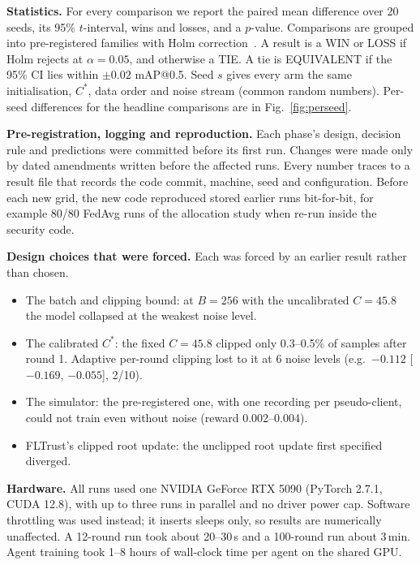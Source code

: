 \documentclass[journal]{IEEEtran}
\makeatletter
\newcommand{\mAP}{mAP@0.5}
\makeatother
\begin{document}
\textbf{Statistics.} For every comparison we report the paired mean difference over 20 seeds, its
95\% $t$-interval, wins and losses, and a $p$-value. Comparisons are grouped into pre-registered
families with Holm correction~\cite{holm1979}. A result is a WIN or LOSS if Holm rejects at
$\alpha = 0.05$, and otherwise a TIE. A tie is EQUIVALENT if the 95\% CI lies within $\pm0.02$
\mAP{}. Seed $s$ gives every arm the same initialisation, $C^\ast$, data order and noise stream
(common random numbers). Per-seed differences for the headline comparisons are in
Fig.~\ref{fig:perseed}.

\textbf{Pre-registration, logging and reproduction.} Each phase's design, decision rule and
predictions were committed before its first run. Changes were made only by dated amendments written
before the affected runs. Every number traces to a result file that records the code commit,
machine, seed and configuration. Before each new grid, the new code reproduced stored earlier runs
bit-for-bit, for example 80/80 FedAvg runs of the allocation study when re-run inside the security
code.

\textbf{Design choices that were forced.} Each was forced by an earlier result rather than chosen.
\begin{itemize}
  \item The batch and clipping bound: at $B=256$ with the uncalibrated $C=45.8$ the model collapsed
  at the weakest noise level.
  \item The calibrated $C^\ast$: the fixed $C=45.8$ clipped only 0.3--0.5\% of samples after round 1.
  Adaptive per-round clipping lost to it at 6 noise levels (e.g.\ $-0.112$ [$-0.169$, $-0.055$], 2/10).
  \item The simulator: the pre-registered one, with one recording per pseudo-client, could not train
  even without noise (reward 0.002--0.004).
  \item FLTrust's clipped root update: the unclipped root update first specified diverged.
\end{itemize}

\textbf{Hardware.} All runs used one NVIDIA GeForce RTX 5090 (PyTorch 2.7.1, CUDA 12.8), with up to
three runs in parallel and no driver power cap. Software throttling was used instead; it inserts
sleeps only, so results are numerically unaffected. A 12-round run took about 20--30\,s and a
100-round run about 3\,min. Agent training took 1--8 hours of wall-clock time per agent on the
shared GPU.

\end{document}
